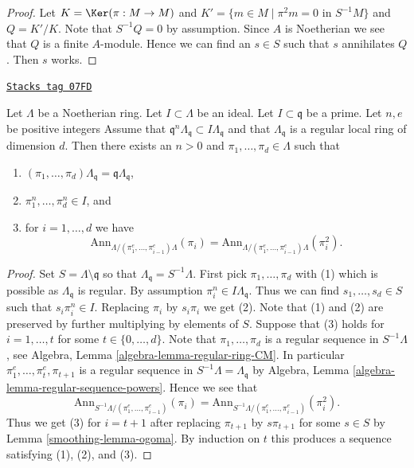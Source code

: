 \begin{proof}
Let $K = \Ker(\pi : M \to M)$ and
$K' = \{m \in M \mid \pi^2 m = 0\text{ in }S^{-1}M\}$ and
$Q = K'/K$. Note that $S^{-1}Q = 0$ by assumption. Since $A$
is Noetherian we see that $Q$ is a finite $A$-module.
Hence we can find an $s \in S$ such that $s$ annihilates $Q$.
Then $s$ works.
\end{proof}

\begin{lemma}
\label{smoothing-lemma-find-sequence}
\href{https://stacks.math.columbia.edu/tag/07FD}{\texttt{Stacks tag 07FD}}

Let $\Lambda$ be a Noetherian ring. Let $I \subset \Lambda$ be an ideal.
Let $I \subset \mathfrak q$ be a prime. Let $n, e$ be positive integers
Assume that $\mathfrak q^n\Lambda_\mathfrak q \subset I\Lambda_\mathfrak q$
and that $\Lambda_\mathfrak q$ is a regular local ring of dimension $d$.
Then there exists an $n > 0$ and
$\pi_1, \ldots, \pi_d \in \Lambda$ such that
\begin{enumerate}
\item $(\pi_1, \ldots, \pi_d)\Lambda_\mathfrak q =
\mathfrak q\Lambda_\mathfrak q$,
\item $\pi_1^n, \ldots, \pi_d^n \in I$, and
\item for $i = 1, \ldots, d$ we have
$$
\text{Ann}_{\Lambda/(\pi_1^e, \ldots, \pi_{i - 1}^e)\Lambda}(\pi_i) =
\text{Ann}_{\Lambda/(\pi_1^e, \ldots, \pi_{i - 1}^e)\Lambda}(\pi_i^2).
$$
\end{enumerate}
\end{lemma}

\begin{proof}

Set $S = \Lambda \setminus \mathfrak q$ so that
$\Lambda_\mathfrak q = S^{-1}\Lambda$.
First pick $\pi_1, \ldots, \pi_d$ with (1) which is possible
as $\Lambda_\mathfrak q$ is regular. By assumption
$\pi_i^n \in I\Lambda_\mathfrak q$. Thus we can find
$s_1, \ldots, s_d \in S$ such that $s_i\pi_i^n \in I$.
Replacing $\pi_i$ by $s_i\pi_i$ we get (2).
Note that (1) and (2) are preserved by further multiplying by elements of $S$.
Suppose that (3) holds for $i = 1, \ldots, t$ for some
$t \in \{0, \ldots, d\}$. Note that
$\pi_1, \ldots, \pi_d$ is a regular sequence in $S^{-1}\Lambda$, see
Algebra, Lemma \ref{algebra-lemma-regular-ring-CM}.
In particular $\pi_1^e, \ldots, \pi_t^e, \pi_{t + 1}$ is a
regular sequence in $S^{-1}\Lambda = \Lambda_\mathfrak q$ by
Algebra, Lemma \ref{algebra-lemma-regular-sequence-powers}.
Hence we see that
$$
\text{Ann}_{S^{-1}\Lambda/(\pi_1^e, \ldots, \pi_{i - 1}^e)}(\pi_i) =
\text{Ann}_{S^{-1}\Lambda/(\pi_1^e, \ldots, \pi_{i - 1}^e)}(\pi_i^2).
$$
Thus we get (3) for $i = t + 1$ after replacing $\pi_{t + 1}$ by $s\pi_{t + 1}$
for some $s \in S$ by Lemma \ref{smoothing-lemma-ogoma}. By induction on $t$ this
produces a sequence satisfying (1), (2), and (3).
\end{proof}

